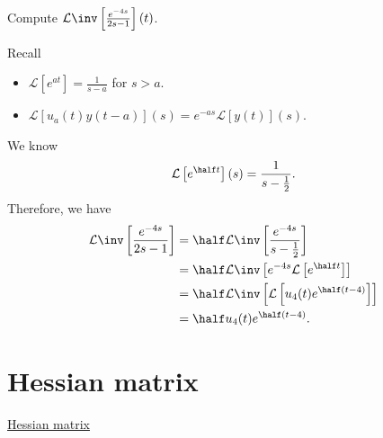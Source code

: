 \documentclass[12pt, a4paper]{article}
\newcommand{\CL}{\mathcal{L}}
\begin{document}
\begin{example}
    Compute \(\CL\inv\left[ \frac{e^{-4s}}{2s-1} \right](t)\).
    \begin{solution}
        Recall 
        \begin{itemize}
            \item \(\CL[e^{at}]= \frac{1}{s-a}\) for \(s>a\).
            \item \(\CL[u_a(t)y(t-a)](s)=e^{-as}\CL[y(t)](s)\).
        \end{itemize}
        We know 
        \[\CL\left[e^{\half t}\right](s) = \frac{1}{s-\frac{1}{2}}.\]
        Therefore, we have
        \[\begin{aligned}
            \CL\inv\left[ \frac{e^{-4s}}{2s-1} \right] &= \half \CL\inv \left[ \frac{e^{-4s}}{s-\frac{1}{2}} \right] \\
            &= \half \CL\inv \left[ e^{-4s} \CL\left[e^{\half t}\right] \right] \\
            &= \half \CL\inv \left[ \CL\left[ u_4(t) e^{\half (t-4)} \right] \right] \\
            &= \half u_4(t) e^{\half (t-4)}.
        \end{aligned}\]
    \end{solution}
\end{example}

\section{Hessian matrix}

\href{https://en.wikipedia.org/wiki/Second_partial_derivative_test#Notes}{Hessian matrix}
\end{document}
